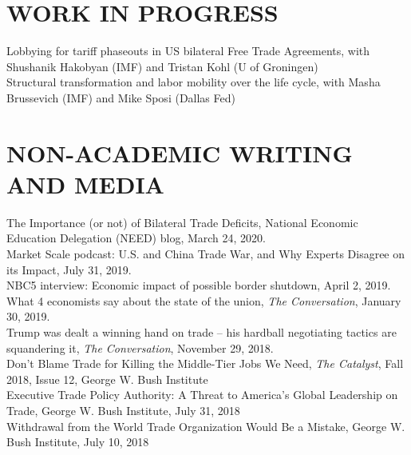 \documentclass[11pt]{res}
\begin{document}
\begin{resume}
\section{WORK IN PROGRESS}\vspace{1.5mm}
Lobbying for tariff phaseouts in US bilateral Free Trade Agreements, with Shushanik Hakobyan (IMF) and Tristan Kohl (U of Groningen)\vspace{1.5mm}\\
Structural transformation and labor mobility over the life cycle, with Masha Brussevich (IMF) and Mike Sposi (Dallas Fed)


\section{NON-ACADEMIC WRITING AND MEDIA}\vspace{1.5mm}
The Importance (or not) of Bilateral Trade Deficits, National Economic Education Delegation (NEED) blog, March 24, 2020.\vspace{1.5mm}\\
Market Scale podcast: U.S. and China Trade War, and Why Experts Disagree on its Impact, July 31, 2019.\vspace{1.5mm}\\
NBC5 interview: Economic impact of possible border shutdown, April 2, 2019.\vspace{1.5mm}\\
What 4 economists say about the state of the union, \emph{The Conversation}, January 30, 2019.\vspace{1.5mm}\\
Trump was dealt a winning hand on trade – his hardball negotiating tactics are squandering it, \emph{The Conversation}, November 29, 2018.\vspace{1.5mm}\\
Don't Blame Trade for Killing the Middle-Tier Jobs We Need, \emph{The Catalyst}, Fall 2018, Issue 12, George W. Bush Institute\vspace{1.5mm}\\
Executive Trade Policy Authority: A Threat to America’s Global Leadership on Trade, George W. Bush Institute, July 31, 2018\vspace{1.5mm}\\
Withdrawal from the World Trade Organization Would Be a Mistake, George W. Bush Institute, July 10, 2018






\end{resume}
\end{document}
